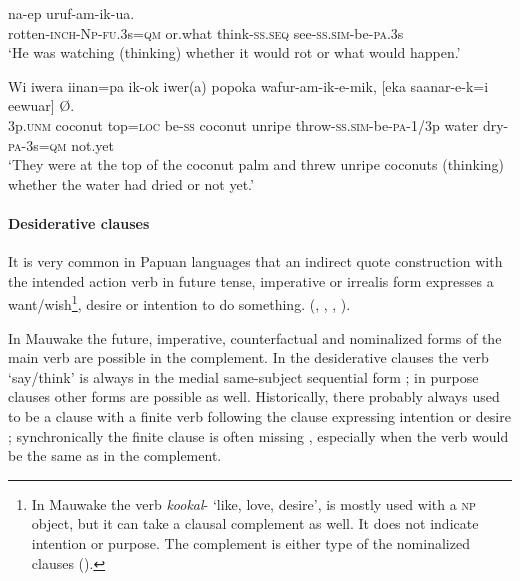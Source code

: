 \ea%
\label{ex:8:x1591}
\gll [Beel-al-i-non=i  kamenion]  na-ep uruf-am-ik-ua.\\
rotten-\textsc{inch}-\textsc{Np}-\textsc{fu}.3s=\textsc{qm} or.what  think-\textsc{ss}.\textsc{seq} see-\textsc{ss}.\textsc{sim}-be-\textsc{pa}.3s\\
\glt`He was watching (thinking) whether it would rot or what would happen.'
\z


\ea%
\label{ex:8:x1593}
\gll Wi  iwera  iinan=pa  ik-ok  iwer(a)  popoka wafur-am-ik-e-mik,  [eka  saanar-e-k=i  eewuar] {\O}. \\
3p.\textsc{unm} coconut top=\textsc{loc} be-\textsc{ss} coconut unripe throw-\textsc{ss}.\textsc{sim}-be-\textsc{pa}-1/3p water dry-\textsc{pa}-3s=\textsc{qm} not.yet\\
\glt`They were at the top of the coconut palm and threw unripe coconuts (thinking) whether the water had dried or not yet.'
\z


\paragraph[Desiderative clauses]{Desiderative clauses}\label{sec:8.3.2.1.3}

It is very common in Papuan languages that an indirect quote construction with the intended action verb in future tense, imperative or irrealis form expresses a want/wish\footnote{In Mauwake the verb \textit{kookal}- `like, love, desire', is mostly used with a \textsc{np} object, but it can take a clausal complement as well. It does not indicate intention or purpose. The complement is either type of the nominalized clauses ().}, desire or intention to do something. (\citealt[254--259]{Reesink1987}, \citealt[157]{Foley1986}, \citealt[112]{Hardin2002}, \citealt[76--77]{Hepner2002}).

In Mauwake the future, imperative, counterfactual and nominalized forms of the main verb are possible in the complement. In the desiderative clauses the verb  `say/think' is always in the medial same-subject sequential form ; in purpose clauses other forms are possible as well. Historically, there probably always used to be a clause with a finite verb following the clause expressing intention or desire ; synchronically the finite clause is often missing , especially when the verb would be the same as in the complement.

